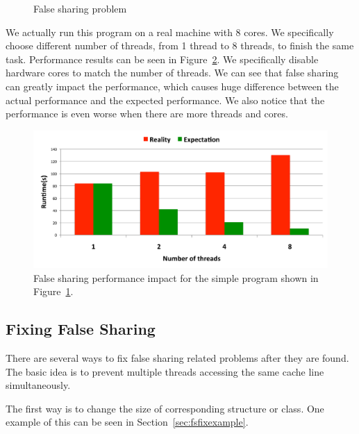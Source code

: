\begin{figure}[!ht]
{\centering
\fbox{
\subfigure{}
\hspace{20pt}
\subfigure{}
}
\caption{False sharing problem
\label{fig:falsesharingexample}}
}
\end{figure}

We actually run this program on a real machine with 8 cores. We specifically choose different number of threads, from 1 thread to 8 threads, to finish the same task. 
Performance results can be seen in Figure~\ref{fig:fsperfimpact}. We specifically disable hardware cores to match the number of threads. We can see that false sharing can greatly impact the performance, which causes huge difference between the actual performance and the expected performance. We also notice that the performance is even worse when there are more threads and cores. 

\begin{figure}[!t]
\centering
\includegraphics[width=5in]{fig/fsperfimpact.pdf}
\caption{
False sharing performance impact for the simple program shown in Figure~\ref{fig:falsesharingexample}.
\label{fig:fsperfimpact}
}
\end{figure}

\subsection{Fixing False Sharing}
There are several ways to fix false sharing related problems after they are found. The basic idea is to prevent multiple threads accessing the same cache line simultaneously.  

The first way is to change the size of corresponding structure or class. One example of this can be seen in Section~\ref{sec:fsfixexample}.

